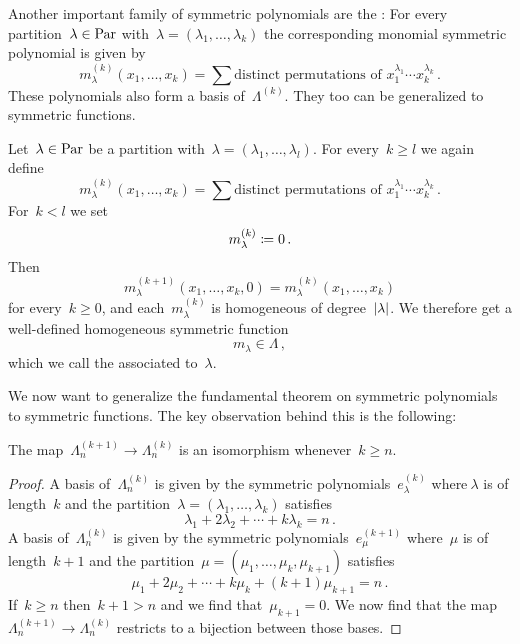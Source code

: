 \documentclass[a4paper,11pt]{scrartcl}
\begin{document}
Another important family of symmetric polynomials are the :
For every partition~$\lambda \in \mathrm{Par}$ with~$\lambda = (\lambda_1, \dotsc, \lambda_k)$ the corresponding monomial symmetric polynomial is given by
\[
  m^{(k)}_\lambda(x_1, \dotsc, x_k)
  =
  \sum \text{distinct permutations of~$x_1^{\lambda_1} \dotsm x_k^{\lambda_k}$} \,.
\]
These polynomials also form a basis of~$\Lambda^{(k)}$.
They too can be generalized to symmetric functions.

\begin{example}
  Let~$\lambda \in \mathrm{Par}$ be a partition with~$\lambda = (\lambda_1, \dotsc, \lambda_l)$.
  For every~$k \geq l$ we again define
  \[
    m^{(k)}_\lambda(x_1, \dotsc, x_k)
    =
    \sum \text{distinct permutations of~$x_1^{\lambda_1} \dotsm x_k^{\lambda_k}$} \,.
  \]
  For~$k < l$ we set
  \[
    m^{(k)}_\lambda \coloneqq 0 \,.
  \]
  Then
  \[
    m^{(k+1)}_\lambda(x_1, \dotsc, x_k, 0)
    =
    m^{(k)}_\lambda(x_1, \dotsc, x_k)
  \]
  for every~$k \geq 0$, and each~$m_\lambda^{(k)}$ is homogeneous of degree~$\lvert\lambda\rvert$.
  We therefore get a well-defined homogeneous symmetric function
  \[
    m_\lambda
    \in
    \Lambda \,,
  \]
  which we call the  associated to~$\lambda$.
\end{example}

We now want to generalize the fundamental theorem on symmetric polynomials to symmetric functions.
The key observation behind this is the following:

\begin{proposition}
  \label{sequence stabilizes}
  The map~$\Lambda^{(k+1)}_n \to \Lambda^{(k)}_n$ is an isomorphism whenever~$k \geq n$. 
\end{proposition}

\begin{proof}
  A basis of~$\Lambda^{(k)}_n$ is given by the symmetric polynomials~$e^{(k)}_\lambda$ where$~\lambda$ is of length~$k$ and the partition~$\lambda = (\lambda_1, \dotsc, \lambda_k)$ satisfies
  \[
    \lambda_1 + 2 \lambda_2 + \dotsb + k \lambda_k = n \,.
  \]
  A basis of~$\Lambda^{(k)}_n$ is given by the symmetric polynomials~$e^{(k+1)}_\mu$ where~$\mu$ is of length~$k+1$ and the partition~$\mu = (\mu_1, \dotsc, \mu_k, \mu_{k+1})$ satisfies
  \[
    \mu_1 + 2 \mu_2 + \dotsb + k \mu_k + (k+1) \mu_{k+1} = n \,.
  \]
  If~$k \geq n$ then~$k+1 > n$ and we find that~$\mu_{k+1} = 0$.
  We now find that the map~$\Lambda^{(k+1)}_n \to \Lambda^{(k)}_n$ restricts to a bijection between those bases.
\end{proof}
\end{document}
